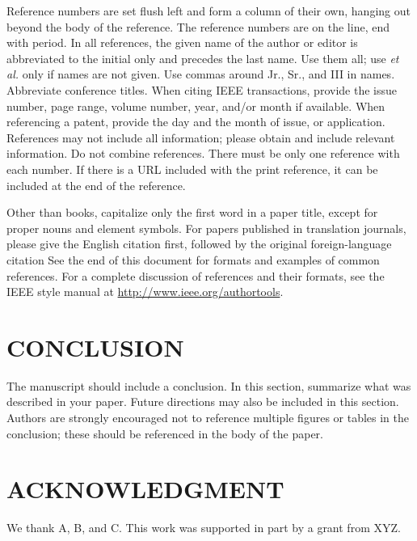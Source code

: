 \documentclass{IEEEcsmag}
\begin{document}
Reference numbers are set flush left and form a column of their own, hanging 
out beyond the body of the reference. The reference numbers are on the line, 
end with period. In all references, the given name of the author 
or editor is abbreviated to the initial only and precedes the last name. Use 
them all; use \emph{et al.} only if names are not given. Use commas around Jr., 
Sr., and III in names. Abbreviate conference titles. When citing IEEE 
transactions, provide the issue number, page range, volume number, year, 
and/or month if available. When referencing a patent, provide the day and 
the month of issue, or application. References may not include all 
information; please obtain and include relevant information. Do not combine 
references. There must be only one reference with each number. If there is a 
URL included with the print reference, it can be included at the end of the\break 
reference. 

Other than books, capitalize only the first word in a paper title, except 
for proper nouns and element symbols. For papers published in translation 
journals, please give the English citation first, followed by the original 
foreign-language citation See the end of this document for formats and 
examples of common references. For a complete discussion of references and 
their formats, see the IEEE style manual at
\url{http://www.ieee.org/authortools}.

\section{CONCLUSION}

The manuscript should include a conclusion. In this section, summarize what was described in your paper. Future directions may also be included in this section. Authors are strongly encouraged not to reference multiple figures or tables in the conclusion; these should be referenced in the body of the paper.

\section{ACKNOWLEDGMENT}

We thank A, B, and C. This work was supported in part by a grant from XYZ.
\end{document}
